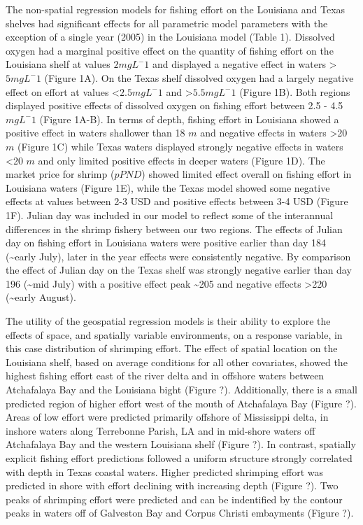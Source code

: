 \documentclass[10pt]{article}
\begin{document}
The non-spatial regression models for fishing effort on the Louisiana and Texas shelves had significant effects for all parametric model parameters with the exception of a single year (2005) in the Louisiana model (Table 1).  Dissolved oxygen had a marginal positive effect on the quantity of fishing effort on the Louisiana shelf at values \testless $ 2 mg L^-1 $ and displayed a negative effect in waters \textgreater $ 5 mg L^-1 $ (Figure 1A).  On the Texas shelf dissolved oxygen had a largely negative effect on effort at values \textless $ 2.5 mg L^-1 $ and \textgreater $ 5.5 mg L^-1 $ (Figure 1B).  Both regions displayed positive effects of dissolved oxygen on fishing effort between 2.5 - 4.5 $ mg L^-1 $ (Figure 1A-B).  In terms of depth, fishing effort in Louisiana showed a positive effect in waters shallower than 18 $ m $ and negative effects in waters \textgreater 20 $ m $ (Figure 1C) while Texas waters displayed strongly negative effects in waters \textless 20 $ m $ and only limited positive effects in deeper waters (Figure 1D).  The market price for shrimp ($ pPND $) showed limited effect overall on fishing effort in Louisiana waters (Figure 1E), while the Texas model showed some negative effects at values between 2-3 USD and positive effects between 3-4 USD (Figure 1F).  Julian day was included in our model to reflect some of the interannual differences in the shrimp fishery between our two regions.  The effects of Julian day on fishing effort in Louisiana waters were positive earlier than day 184 (\sim early July), later in the year effects were consistently negative.  By comparison the effect of Julian day on the Texas shelf was strongly negative earlier than day 196 (\sim mid July) with a positive effect peak \sim 205 and negative effects \textgreater 220 (\sim early August).  

The utility of the geospatial regression models is their ability to explore the effects of space, and spatially variable environments, on a response variable, in this case distribution of shrimping effort.  The effect of spatial location on the Louisiana shelf, based on average conditions for all other covariates, showed the highest fishing effort east of the river delta and in offshore waters between Atchafalaya Bay and the Louisiana bight (Figure ?).  Additionally, there is a small predicted region of higher effort west of the mouth of Atchafalaya Bay (Figure ?).  Areas of low effort were predicted primarily offshore of Mississippi delta, in inshore waters along Terrebonne Parish, LA and in mid-shore waters off Atchafalaya Bay and the western Louisiana shelf (Figure ?).  In contrast, spatially explicit fishing effort predictions followed a uniform structure strongly correlated with depth in Texas coastal waters.  Higher predicted shrimping effort was predicted in shore with effort declining with increasing depth (Figure ?).  Two peaks of shrimping effort were predicted and can be indentified by the contour peaks in waters off of Galveston Bay and Corpus Christi embayments (Figure ?).  
\end{document}
